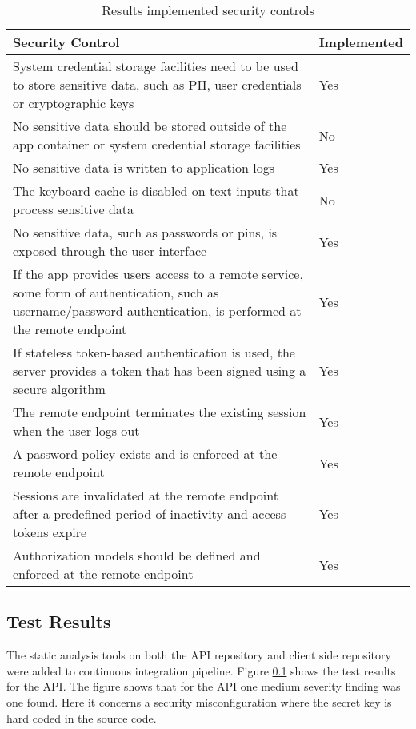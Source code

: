 \begin{table}
    \centering
    \caption{Results implemented security controls}
    \label{tab:results-implemented}
    \begin{tabulary}{0.5\textwidth}{|L|l|}
        \hline
        \textbf{Security Control} & \textbf{Implemented} \\
        \hline
        System credential storage facilities need to be used to store sensitive data, such as PII, user credentials or cryptographic keys & Yes \\
        \hline
        No sensitive data should be stored outside of the app container or system credential storage facilities & No \\
        \hline
        No sensitive data is written to application logs & Yes \\
        \hline
        The keyboard cache is disabled on text inputs that process sensitive data & No \\
        \hline
        No sensitive data, such as passwords or pins, is exposed through the user interface & Yes \\
        \hline
        If the app provides users access to a remote service, some form of authentication, such as username/password authentication, is performed at the remote endpoint & Yes \\
        \hline
        If stateless token-based authentication is used, the server provides a token that has been signed using a secure algorithm & Yes \\
        \hline
        The remote endpoint terminates the existing session when the user logs out & Yes \\
        \hline
        A password policy exists and is enforced at the remote endpoint & Yes \\
        \hline
        Sessions are invalidated at the remote endpoint after a predefined period of inactivity and access tokens expire & Yes \\
        \hline
        Authorization models should be defined and enforced at the remote endpoint & Yes \\
        \hline
    \end{tabulary}
\end{table}

\subsection{Test Results}
The static analysis tools on both the API repository and client side repository were added to continuous integration pipeline. Figure \ref{} shows the test results for the API. The figure shows that for the API one medium severity finding was one found. Here it concerns a security misconfiguration where the secret key is hard coded in the source code.

